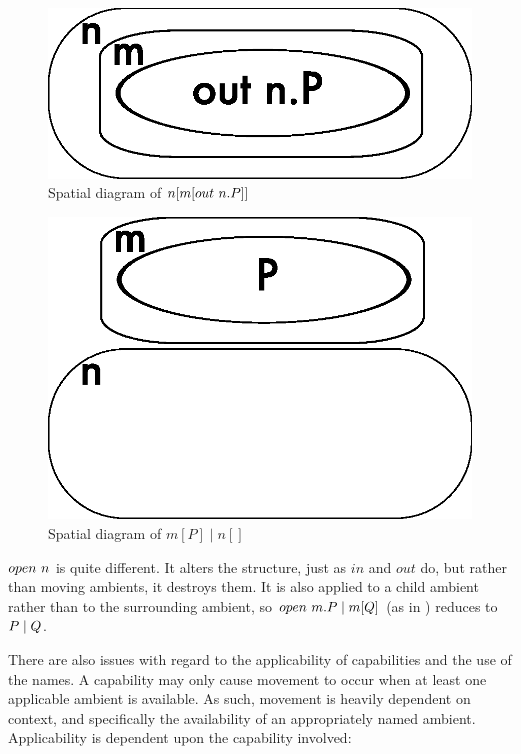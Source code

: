 \begin{figure}  
  \centering
  \includegraphics[scale=0.3]{ambient2}
  \caption{Spatial diagram of $n[m[out\ n.P]]$}
  \label{fig:ambient2}
\end{figure}

\begin{figure}  
  \centering
  \includegraphics[scale=0.3]{ambient3}
  \caption{Spatial diagram of $m[P] \mid n[]$}
  \label{fig:ambient3}
\end{figure}

$open\ n$ is quite different.  It alters the structure, just as $in$ and
$out$ do, but rather than moving ambients, it destroys them.  It is also
applied to a child ambient rather than to the surrounding ambient, so
$open\ m.P \;|\; m[Q]$ (as in \cite{amb}) reduces to $P \;|\; Q$.

There are also issues with regard to the applicability of capabilities
and the use of the names.  A capability may only cause movement to occur
when at least one applicable ambient is available.  As such, movement
is heavily dependent on context, and specifically the availability of an
appropriately named ambient.  Applicability is dependent upon the
capability involved:

